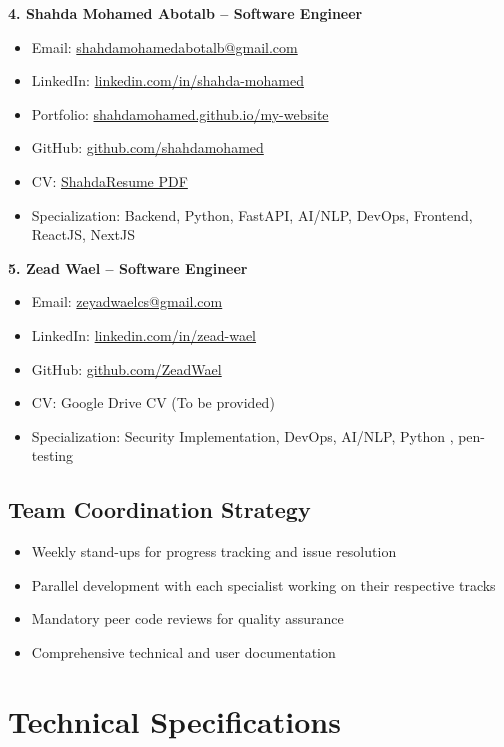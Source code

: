 \documentclass[12pt,a4paper]{article}
\begin{document}
\textbf{4. Shahda Mohamed Abotalb – Software Engineer}
\begin{itemize}
    \item Email: \href{mailto:shahdamohamedabotalb@gmail.com}{shahdamohamedabotalb@gmail.com}
    \item LinkedIn: \href{https://www.linkedin.com/in/shahda-mohamed-178537280}{linkedin.com/in/shahda-mohamed}
    \item Portfolio: \href{https://shahdamohamed.github.io/my-website}{shahdamohamed.github.io/my-website}
    \item GitHub: \href{https://github.com/shahdamohamed}{github.com/shahdamohamed}
    \item CV: \href{https://shahdamohamed.github.io/my-website/assets/resume.pdf}{ShahdaResume PDF}
    \item Specialization: Backend, Python, FastAPI, AI/NLP, DevOps, Frontend, ReactJS, NextJS
\end{itemize}

\textbf{5. Zead Wael – Software Engineer}
\begin{itemize}
    \item Email: \href{mailto:zeyadwaelcs@gmail.com}{zeyadwaelcs@gmail.com}
    \item LinkedIn: \href{https://www.linkedin.com/in/zead-wael}{linkedin.com/in/zead-wael}
    \item GitHub: \href{https://github.com/ZeadWael}{github.com/ZeadWael}
    \item CV: Google Drive CV (To be provided)
    \item Specialization: Security Implementation, DevOps, AI/NLP, Python , pen-testing
\end{itemize}

\subsection*{Team Coordination Strategy}
\begin{itemize}
    \item Weekly stand-ups for progress tracking and issue resolution
    \item Parallel development with each specialist working on their respective tracks
    \item Mandatory peer code reviews for quality assurance
    \item Comprehensive technical and user documentation
\end{itemize}

\section*{Technical Specifications}
\end{document}
